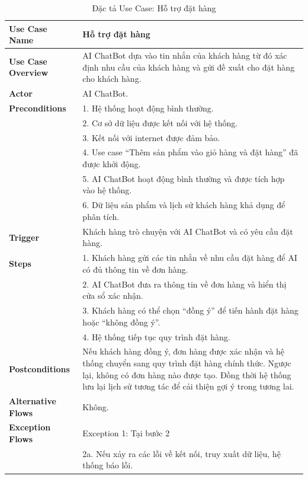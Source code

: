 {\begin{longtable}{|>{\bfseries}p{4cm}|p{11.5cm}|}
\caption{Đặc tả Use Case: Hỗ trợ đặt hàng}
\label{tab:uc-chatbot-order-support} \\
\hline
\textbf{Use Case Name} & Hỗ trợ đặt hàng \\
\hline
\textbf{Use Case Overview} & AI ChatBot dựa vào tin nhắn của khách hàng từ đó xác định nhu cầu của khách hàng và gửi đề xuất cho đặt hàng cho khách hàng. \\
\hline
\textbf{Actor} & AI ChatBot. \\
\hline
\textbf{Preconditions} & 1. Hệ thống hoạt động bình thường. \\
& 2. Cơ sở dữ liệu được kết nối với hệ thống. \\
& 3. Kết nối với internet được đảm bảo. \\
& 4. Use case “Thêm sản phẩm vào giỏ hàng và đặt hàng” đã được khởi động. \\
& 5. AI ChatBot hoạt động bình thường và được tích hợp vào hệ thống. \\
& 6. Dữ liệu sản phẩm và lịch sử khách hàng khả dụng để phân tích. \\
\hline
\textbf{Trigger} & Khách hàng trò chuyện với AI ChatBot và có yêu cầu đặt hàng. \\
\hline
\textbf{Steps} & 1. Khách hàng gửi các tin nhắn về nhu cầu đặt hàng để AI có đủ thông tin về đơn hàng. \\
& 2. AI ChatBot đưa ra thông tin về đơn hàng và hiển thị cửa sổ xác nhận. \\
& 3. Khách hàng có thể chọn “đồng ý” để tiến hành đặt hàng hoặc “không đồng ý”. \\
& 4. Hệ thống tiếp tục quy trình đặt hàng. \\
\hline
\textbf{Postconditions} & Nếu khách hàng đồng ý, đơn hàng được xác nhận và hệ thống chuyển sang quy trình đặt hàng chính thức. Ngược lại, không có đơn hàng nào được tạo. Đồng thời hệ thống lưu lại lịch sử tương tác để cải thiện gợi ý trong tương lai. \\
\hline
\textbf{Alternative Flows} & Không. \\
\hline
\textbf{Exception Flows} & Exception 1: Tại bước 2 \\
& 2a. Nếu xảy ra các lỗi về kết nối, truy xuất dữ liệu, hệ thống báo lỗi. \\
\hline
\end{longtable}

\vspace{2em}

}
